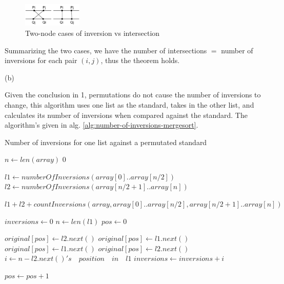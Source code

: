 \documentclass{article}
\begin{document}
\begin{description}
  \begin{figure}[h]
  \centering
  \includegraphics[width=0.25\textwidth]{pb2}
  \caption{Two-node cases of inversion vs intersection}
  \label{fig:pb2}
  \end{figure}

  Summarizing the two cases, we have the number of intersections $ = $ number of inversions for each pair $(i,j)$, thus the theorem holds. 

  (b)

  Given the conclusion in 1, permutations do not cause the number of inversions to change, this algorithm uses one list as the standard, takes in the other list, and calculates its number of inversions when compared against the standard. The algorithm's given in alg. \ref{alg:number-of-inversions-mergesort}.
  
  \begin{algorithm}[h]
  \caption{Number of inversions for one list against a permutated standard}
  \label{alg:number-of-inversions-mergesort}
    \begin{algorithmic}[1]
      \State $n \gets len(array)$
        \State \Return $0$
      \EndIf
      
      \State $l1 \gets numberOfInversions(array[0]..array[n/2])$
      \State $l2 \gets numberOfInversions(array[n/2+1]..array[n])$

      \State \Return $l1 + l2 + countInversions(array, array[0]..array[n/2], array[n/2+1]..array[n])$
    \EndFunction

      \State $inversions \gets 0$
      \State $n \gets len(l1)$
      \State $pos \gets 0$

          \State $original[pos] \gets l2.next()$
          \State $original[pos] \gets l1.next()$
          \State $original[pos] \gets l1.next()$
        \Else
          \State $original[pos] \gets l2.next()$
          \State $i \gets n - l2.next()'s \quad position \quad in \quad l1$
          \State $inversions \gets inversions + i$
        \EndIf
        
        \State $pos \gets pos + 1$
      \EndWhile


\end{algorithmic}
\end{algorithm}
\end{description}
\end{document}
